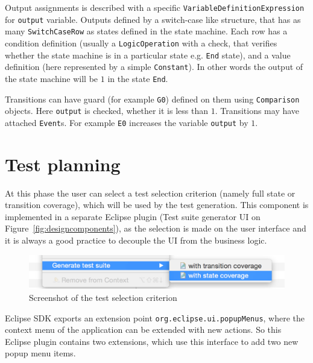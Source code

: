 Output assignments is described with a specific \texttt{VariableDefinitionExpression} for \texttt{output} variable. Outputs defined by a switch-case like structure, that has as many \texttt{SwitchCaseRow} as states defined in the state machine. Each row has a condition definition (usually a \texttt{LogicOperation} with a check, that verifies whether the state machine is in a particular state e.g. \texttt{End} state), and a value definition (here represented by a simple \texttt{Constant}). In other words the output of the state machine will be $1$ in the state \texttt{End}.

Transitions can have guard (for example \texttt{G0}) defined on them using \texttt{Comparison} objects. Here \texttt{output} is checked, whether it is less than $1$. Transitions may have attached \texttt{Event}s. For example \texttt{E0} increases the variable \texttt{output} by $1$.


\section{Test planning}
\label{sec:testplanningimplementation}

At this phase the user can select a test selection criterion (namely full state or transition coverage), which will be used by the test generation. This component is implemented in a separate Eclipse plugin (Test suite generator UI on Figure~\ref{fig:designcomponents}), as the selection is made on the user interface and it is always a good practice to decouple the UI from the business logic.
	
\begin{figure}[htp]
\centering
\includegraphics[scale=0.4]{figures/implementation_screenshot}
\caption{Screenshot of the test selection criterion}
\label{fig:implementation_screenshot}
\end{figure}
	
Eclipse SDK exports an extension point \texttt{org.eclipse.ui.popupMenus}, where the context menu of the application can be extended with new actions. So this Eclipse plugin contains two extensions, which use this interface to add two new popup menu items.
	
	
